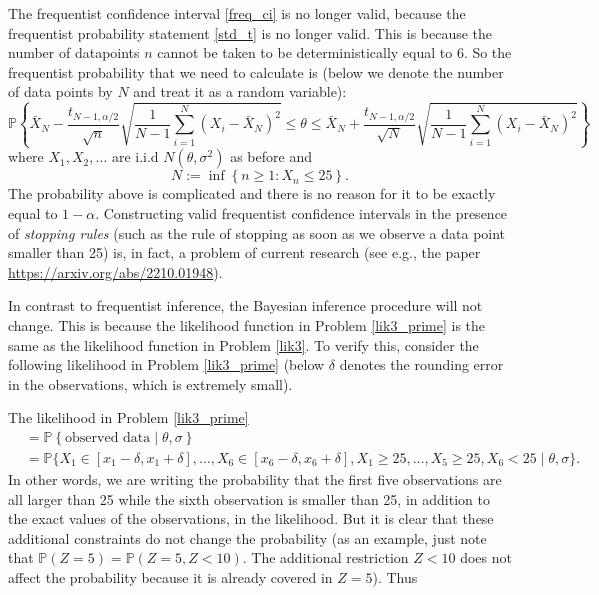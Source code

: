 \documentclass{scrartcl}
\newcommand{\P}{{\mathbb P}}
\begin{document}
The
frequentist confidence interval \eqref{freq_ci} is no longer
valid, because the
frequentist probability statement \eqref{std_t} is no longer
valid. This is because the number of datapoints $n$ cannot be taken to
be deterministically equal to 6. So the frequentist probability that we
need to calculate is (below we denote the number of data points by $N$
and treat it as a random variable):
\begin{equation*}
  \P \left\{\bar{X}_N - \frac{t_{N-1,
      \alpha/2}}{\sqrt{n}}  
  \sqrt{\frac{1}{N-1} \sum_{i=1}^N (X_i - \bar{X}_N)^2} \leq \theta \leq
  \bar{X}_N + \frac{t_{N-1,
      \alpha/2}}{\sqrt{N}}  
  \sqrt{\frac{1}{N-1} \sum_{i=1}^N (X_i - \bar{X}_N)^2}  
\right\} 
\end{equation*}
where $X_1, X_2, \dots$ are i.i.d $N(\theta, \sigma^2)$ as before and
\begin{equation*}
  N := \inf \left\{n \geq 1 : X_n \leq 25 \right\}. 
\end{equation*}
The probability above is complicated and there is no reason for
it to be exactly equal to $1 - \alpha$. Constructing valid frequentist 
confidence intervals in the presence of \textit{stopping rules} (such
as the rule of stopping as soon as we observe a data point smaller than 25) 
is, in 
fact, a problem of current research (see e.g., the paper
\url{https://arxiv.org/abs/2210.01948}).

In contrast to frequentist inference, the Bayesian inference procedure
will not change. This is because the likelihood function in Problem
\ref{lik3_prime} is the same as the likelihood function in Problem
\ref{lik3}. To verify this, consider the following likelihood in Problem
\ref{lik3_prime} (below $\delta$ denotes the rounding error in the
observations, which is extremely small).

The likelihood in Problem \ref{lik3_prime}
\begin{align*}
&= \P
                                                  \left\{\text{observed
                                                  data} \mid 
                                                  \theta, \sigma
                                                  \right\} \\
  &= \P\{X_1 \in [x_1 - \delta, x_1 + \delta], \dots, X_6 \in [x_6 -
    \delta, x_6 + \delta], X_1 \geq 25, \dots, X_5 \ge 25, X_6 < 25
    \mid \theta, \sigma \}.
\end{align*}
In other words, we are writing the probability that the first five
observations are all larger than 25 while the sixth observation is
smaller than 25, in addition to the exact values of the observations,
in the likelihood. But it is clear that these additional constraints
do not change the probability (as an example, just note that $\P(Z =
5) = \P(Z = 5, Z < 10)$. The additional restriction $Z < 10$ does not
affect the probability because it is already covered in $Z = 5$). Thus
\end{document}
